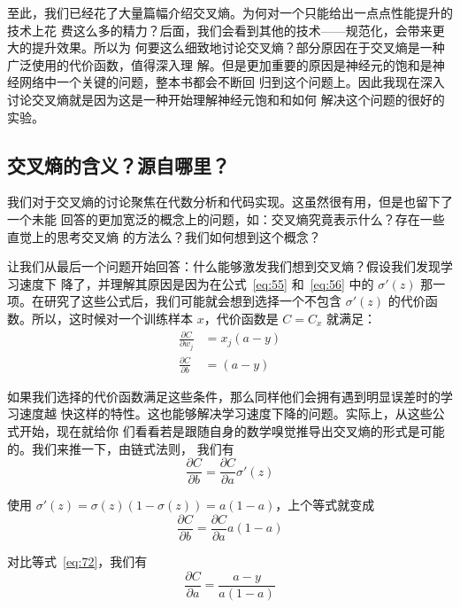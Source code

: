 至此，我们已经花了大量篇幅介绍交叉熵。为何对一个只能给出一点点性能提升的技术上花
费这么多的精力？后面，我们会看到其他的技术——规范化，会带来更大的提升效果。所以为
何要这么细致地讨论交叉熵？部分原因在于交叉熵是一种广泛使用的代价函数，值得深入理
解。但是更加重要的原因是神经元的饱和是神经网络中一个关键的问题，整本书都会不断回
归到这个问题上。因此我现在深入讨论交叉熵就是因为这是一种开始理解神经元饱和和如何
解决这个问题的很好的实验。

\subsection{交叉熵的含义？源自哪里？}

我们对于交叉熵的讨论聚焦在代数分析和代码实现。这虽然很有用，但是也留下了一个未能
回答的更加宽泛的概念上的问题，如：交叉熵究竟表示什么？存在一些直觉上的思考交叉熵
的方法么？我们如何想到这个概念？

让我们从最后一个问题开始回答：什么能够激发我们想到交叉熵？假设我们发现学习速度下
降了，并理解其原因是因为在公式~\eqref{eq:55} 和~\eqref{eq:56} 中的 $\sigma'(z)$
那一项。在研究了这些公式后，我们可能就会想到选择一个不包含 $\sigma'(z)$ 的代价函
数。所以，这时候对一个训练样本 $x$，代价函数是 $C = C_x$ 就满足：
\begin{align} 
  \frac{\partial C}{\partial w_j} &= x_j(a-y) \label{eq:71}\tag{71}\\
  \frac{\partial C}{\partial b } &= (a-y) \label{eq:72}\tag{72}
\end{align}

如果我们选择的代价函数满足这些条件，那么同样他们会拥有遇到明显误差时的学习速度越
快这样的特性。这也能够解决学习速度下降的问题。实际上，从这些公式开始，现在就给你
们看看若是跟随自身的数学嗅觉推导出交叉熵的形式是可能的。我们来推一下，由链式法则，
我们有
\begin{equation}
  \frac{\partial C}{\partial b} = \frac{\partial C}{\partial a} 
  \sigma'(z)
  \tag{73}
\end{equation}

使用 $\sigma'(z) = \sigma(z)(1-\sigma(z)) = a(1-a)$，上个等式就变成
\begin{equation}
  \frac{\partial C}{\partial b} = \frac{\partial C}{\partial a} 
  a(1-a)
  \label{eq:74}\tag{74}
\end{equation}

对比等式~\eqref{eq:72}，我们有
\begin{equation}
  \frac{\partial C}{\partial a} = \frac{a-y}{a(1-a)}
  \label{eq:75}\tag{75}
\end{equation}

